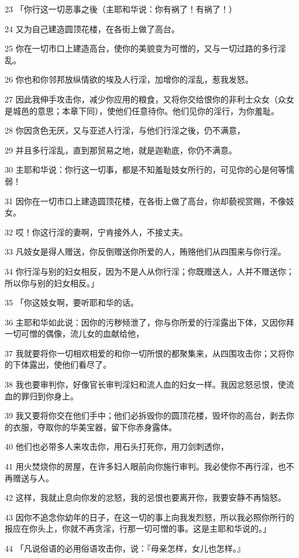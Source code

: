 \par 23 「你行这一切恶事之後（主耶和华说：你有祸了！有祸了！）
\par 24 又为自己建造圆顶花楼，在各街上做了高台。
\par 25 你在一切市口上建造高台，使你的美貌变为可憎的，又与一切过路的多行淫乱。
\par 26 你也和你邻邦放纵情欲的埃及人行淫，加增你的淫乱，惹我发怒。
\par 27 因此我伸手攻击你，减少你应用的粮食，又将你交给恨你的非利士众女（众女是城邑的意思；本章下同），使他们任意待你。他们见你的淫行，为你羞耻。
\par 28 你因贪色无厌，又与亚述人行淫，与他们行淫之後，仍不满意，
\par 29 并且多行淫乱，直到那贸易之地，就是迦勒底，你仍不满意。
\par 30 主耶和华说：你行这一切事，都是不知羞耻妓女所行的，可见你的心是何等懦弱！
\par 31 因你在一切市口上建造圆顶花楼，在各街上做了高台，你却藐视赏赐，不像妓女。
\par 32 哎！你这行淫的妻啊，宁肯接外人，不接丈夫。
\par 33 凡妓女是得人赠送，你反倒赠送你所爱的人，贿赂他们从四围来与你行淫。
\par 34 你行淫与别的妇女相反，因为不是人从你行淫；你既赠送人，人并不赠送你；所以你与别的妇女相反。」
\par 35 「你这妓女啊，要听耶和华的话。
\par 36 主耶和华如此说：因你的污秽倾泄了，你与你所爱的行淫露出下体，又因你拜一切可憎的偶像，流儿女的血献给他，
\par 37 我就要将你一切相欢相爱的和你一切所恨的都聚集来，从四围攻击你；又将你的下体露出，使他们看尽了。
\par 38 我也要审判你，好像官长审判淫妇和流人血的妇女一样。我因忿怒忌恨，使流血的罪归到你身上。
\par 39 我又要将你交在他们手中；他们必拆毁你的圆顶花楼，毁坏你的高台，剥去你的衣服，夺取你的华美宝器，留下你赤身露体。
\par 40 他们也必带多人来攻击你，用石头打死你，用刀剑刺透你，
\par 41 用火焚烧你的房屋，在许多妇人眼前向你施行审判。我必使你不再行淫，也不再赠送与人。
\par 42 这样，我就止息向你发的忿怒，我的忌恨也要离开你，我要安静不再恼怒。
\par 43 因你不追念你幼年的日子，在这一切的事上向我发烈怒，所以我必照你所行的报应在你头上，你就不再贪淫，行那一切可憎的事。这是主耶和华说的。」
\par 44 「凡说俗语的必用俗语攻击你，说：『母亲怎样，女儿也怎样。』

